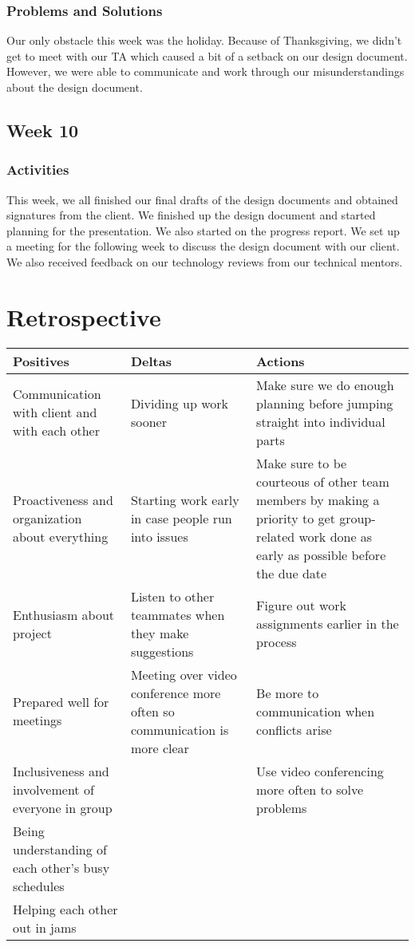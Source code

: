 \documentclass[onecolumn, draftclsnofoot,10pt, compsoc]{IEEEtran}
\begin{document}
\subsubsection{Problems and Solutions}
Our only obstacle this week was the holiday. Because of Thanksgiving, we didn’t get to meet with our TA which caused a bit of a setback on our design document. However, we were able to communicate and work through our misunderstandings about the design document. 

\subsection{Week 10}
\subsubsection{Activities}
This week, we all finished our final drafts of the design documents and obtained signatures from the client. We finished up the design document and started planning for the presentation. We also started on the progress report. We set up a meeting for the following week to discuss the design document with our client. We also received feedback on our technology reviews from our technical mentors.

\section{Retrospective}
\begin{center}
    \begin{tabular}{ | p{5cm} | p{5cm} | p{5cm} |}
    \hline
    \textbf{Positives} & \textbf{Deltas} & \textbf{Actions} \\ \hline
   Communication with client and with each other & Dividing up work sooner & Make sure we do enough planning before jumping straight into individual parts \\ \hline
     Proactiveness and organization about everything & Starting work early in case people run into issues & Make sure to be courteous of other team members by making a priority to get group-related work done as early as possible before the due date  \\ \hline
     Enthusiasm about project  & Listen to other teammates when they make suggestions & Figure out work assignments earlier in the process \\ \hline
      Prepared well for meetings & Meeting over video conference more often so communication is more clear & Be more to communication when conflicts arise\\ \hline
       Inclusiveness and involvement of everyone in group &   & Use video conferencing more often to solve problems \\ \hline
     Being understanding of each other’s busy schedules  &    & \\ \hline
      Helping each other out in jams  & &\\ \hline
    \end{tabular}
\end{center}
\end{document}
